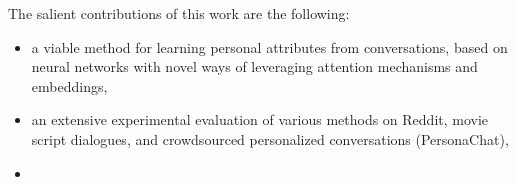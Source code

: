 The salient contributions of this work are the following: 
\begin{itemize}
\item a viable method for learning personal attributes from
conversations, based on neural networks with novel ways of
leveraging attention mechanisms and embeddings,
\item an extensive experimental evaluation of various methods on
Reddit, movie script dialogues, and crowdsourced personalized conversations (PersonaChat),
\item {}
\end{itemize}


